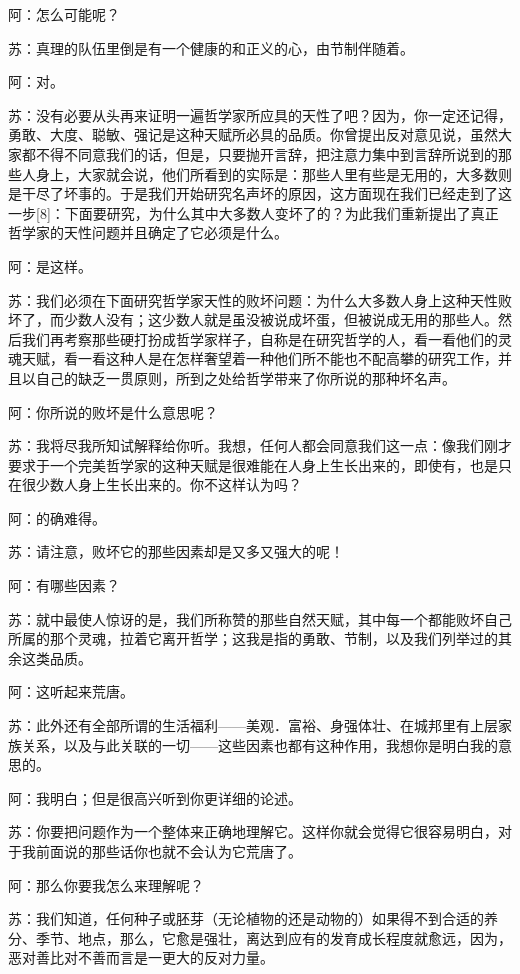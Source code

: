 \documentclass[12pt,oneside]{book}
\begin{document}
阿：怎么可能呢？

苏：真理的队伍里倒是有一个健康的和正义的心，由节制伴随着。

阿：对。

苏：没有必要从头再来证明一遍哲学家所应具的天性了吧？因为，你一定还记得，勇敢、大度、聪敏、强记是这种天赋所必具的品质。你曾提出反对意见说，虽然大家都不得不同意我们的话，但是，只要抛开言辞，把注意力集中到言辞所说到的那些人身上，大家就会说，他们所看到的实际是：那些人里有些是无用的，大多数则是干尽了坏事的。于是我们开始研究名声坏的原因，这方面现在我们已经走到了这一步[8]：下面要研究，为什么其中大多数人变坏了的？为此我们重新提出了真正哲学家的天性问题并且确定了它必须是什么。

阿：是这样。

苏：我们必须在下面研究哲学家天性的败坏问题：为什么大多数人身上这种天性败坏了，而少数人没有；这少数人就是虽没被说成坏蛋，但被说成无用的那些人。然后我们再考察那些硬打扮成哲学家样子，自称是在研究哲学的人，看一看他们的灵魂天赋，看一看这种人是在怎样奢望着一种他们所不能也不配高攀的研究工作，并且以自己的缺乏一贯原则，所到之处给哲学带来了你所说的那种坏名声。

阿：你所说的败坏是什么意思呢？

苏：我将尽我所知试解释给你听。我想，任何人都会同意我们这一点：像我们刚才要求于一个完美哲学家的这种天赋是很难能在人身上生长出来的，即使有，也是只在很少数人身上生长出来的。你不这样认为吗？

阿：的确难得。

苏：请注意，败坏它的那些因素却是又多又强大的呢！

阿：有哪些因素？

苏：就中最使人惊讶的是，我们所称赞的那些自然天赋，其中每一个都能败坏自己所属的那个灵魂，拉着它离开哲学；这我是指的勇敢、节制，以及我们列举过的其余这类品质。

阿：这听起来荒唐。

苏：此外还有全部所谓的生活福利——美观．富裕、身强体壮、在城邦里有上层家族关系，以及与此关联的一切——这些因素也都有这种作用，我想你是明白我的意思的。

阿：我明白；但是很高兴听到你更详细的论述。

苏：你要把问题作为一个整体来正确地理解它。这样你就会觉得它很容易明白，对于我前面说的那些话你也就不会认为它荒唐了。

阿：那么你要我怎么来理解呢？

苏：我们知道，任何种子或胚芽（无论植物的还是动物的）如果得不到合适的养分、季节、地点，那么，它愈是强壮，离达到应有的发育成长程度就愈远，因为，恶对善比对不善而言是一更大的反对力量。
\end{document}

